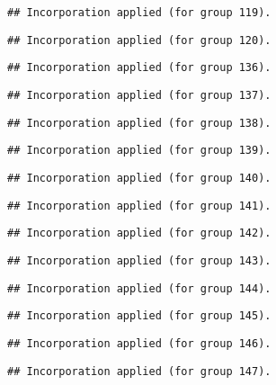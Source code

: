 \documentclass[
  landscape]{article}
\begin{document}
\begin{verbatim}
## Incorporation applied (for group 119).
\end{verbatim}

\begin{verbatim}
## Incorporation applied (for group 120).
\end{verbatim}

\begin{verbatim}
## Incorporation applied (for group 136).
\end{verbatim}

\begin{verbatim}
## Incorporation applied (for group 137).
\end{verbatim}

\begin{verbatim}
## Incorporation applied (for group 138).
\end{verbatim}

\begin{verbatim}
## Incorporation applied (for group 139).
\end{verbatim}

\begin{verbatim}
## Incorporation applied (for group 140).
\end{verbatim}

\begin{verbatim}
## Incorporation applied (for group 141).
\end{verbatim}

\begin{verbatim}
## Incorporation applied (for group 142).
\end{verbatim}

\begin{verbatim}
## Incorporation applied (for group 143).
\end{verbatim}

\begin{verbatim}
## Incorporation applied (for group 144).
\end{verbatim}

\begin{verbatim}
## Incorporation applied (for group 145).
\end{verbatim}

\begin{verbatim}
## Incorporation applied (for group 146).
\end{verbatim}

\begin{verbatim}
## Incorporation applied (for group 147).
\end{verbatim}
\end{document}
